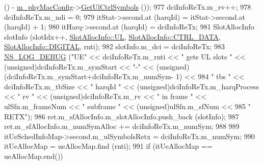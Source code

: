 \begin{DoxyCode}
       () - \hyperlink{classns3_1_1MmWaveMacScheduler_a24d7af4971d2e500fe543cefbafa2fd9}{m\_phyMacConfig}->\hyperlink{classns3_1_1MmWavePhyMacCommon_aa0bf8af14050bc5dc6513fbc86319a9b}{GetUlCtrlSymbols} ());
977                                         dciInfoReTx.m\_rv++;
978                                         dciInfoReTx.m\_ndi = 0;
979                                         itStat->second.at (harqId) = itStat->second.at (harqId) + 1;
980                                         itHarq->second.at (harqId) = dciInfoReTx;
981                                         SlotAllocInfo slotInfo (slotIdx++, 
      \hyperlink{structns3_1_1SlotAllocInfo_a6cad60db1d39034f1851e2cea625fe5da916b5be54594ead6ed677c570311cad2}{SlotAllocInfo::UL}, \hyperlink{structns3_1_1SlotAllocInfo_a3ea7cb503bfd0c9a4df55a71b81b9331a1ea636c3f068558fabacbc39934309b8}{SlotAllocInfo::CTRL\_DATA}, 
      \hyperlink{structns3_1_1SlotAllocInfo_adcbd067d82be6260b3399167d8f0b4eca47a67c342db658a08ded9ce4b49417ea}{SlotAllocInfo::DIGITAL}, rnti);
982                                         slotInfo.m\_dci = dciInfoReTx;
983                                         \hyperlink{group__logging_ga413f1886406d49f59a6a0a89b77b4d0a}{NS\_LOG\_DEBUG} (\textcolor{stringliteral}{"UE"} << dciInfoReTx.m\_rnti << \textcolor{stringliteral}{" gets UL
       slots "} << (\textcolor{keywordtype}{unsigned})dciInfoReTx.m\_symStart << \textcolor{stringliteral}{"-"} << (\textcolor{keywordtype}{unsigned})(dciInfoReTx.m\_symStart+dciInfoReTx.m\_numSym-
      1) <<
984                                                                                          \textcolor{stringliteral}{" tbs "} << 
      dciInfoReTx.m\_tbSize << \textcolor{stringliteral}{" harqId "} << (\textcolor{keywordtype}{unsigned})dciInfoReTx.m\_harqProcess << \textcolor{stringliteral}{" rv "} << (\textcolor{keywordtype}{unsigned})dciInfoReTx.m\_rv 
      << \textcolor{stringliteral}{" in frame "} << ulSfn.m\_frameNum << \textcolor{stringliteral}{" subframe "} << (\textcolor{keywordtype}{unsigned})ulSfn.m\_sfNum <<
985                                                                                          \textcolor{stringliteral}{" RETX"});
986                                         ret.m\_sfAllocInfo.m\_slotAllocInfo.push\_back (slotInfo);
987                                         ret.m\_sfAllocInfo.m\_numSymAlloc += dciInfoReTx.m\_numSym;
988 
989                                         itUeSchedInfoMap->second.m\_ulSymbolsRetx = dciInfoReTx.m\_numSym;
990                                         itUeAllocMap = ueAllocMap.find (rnti);
991                                         \textcolor{keywordflow}{if} (itUeAllocMap == ueAllocMap.end())

\end{DoxyCode}
